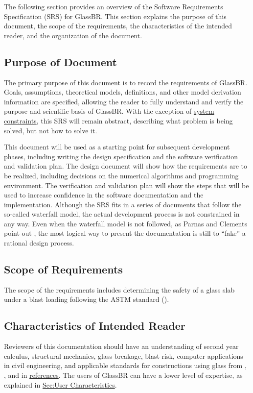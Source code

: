 \documentclass[12pt]{article}
\begin{document}
The following section provides an overview of the Software Requirements Specification (SRS) for GlassBR. This section explains the purpose of this document, the scope of the requirements, the characteristics of the intended reader, and the organization of the document.

\subsection{Purpose of Document}
\label{Sec:DocPurpose}
The primary purpose of this document is to record the requirements of GlassBR. Goals, assumptions, theoretical models, definitions, and other model derivation information are specified, allowing the reader to fully understand and verify the purpose and scientific basis of GlassBR. With the exception of \hyperref[Sec:SysConstraints]{system constraints}, this SRS will remain abstract, describing what problem is being solved, but not how to solve it.

This document will be used as a starting point for subsequent development phases, including writing the design specification and the software verification and validation plan. The design document will show how the requirements are to be realized, including decisions on the numerical algorithms and programming environment. The verification and validation plan will show the steps that will be used to increase confidence in the software documentation and the implementation. Although the SRS fits in a series of documents that follow the so-called waterfall model, the actual development process is not constrained in any way. Even when the waterfall model is not followed, as Parnas and Clements point out \cite{parnasClements1986}, the most logical way to present the documentation is still to ``fake'' a rational design process.

\subsection{Scope of Requirements}
\label{Sec:ReqsScope}
The scope of the requirements includes determining the safety of a glass slab under a blast loading following the ASTM standard (\cite{astm2009}).

\subsection{Characteristics of Intended Reader}
\label{Sec:ReaderChars}
Reviewers of this documentation should have an understanding of second year calculus, structural mechanics, glass breakage, blast risk, computer applications in civil engineering, and applicable standards for constructions using glass from \cite{astm2009}, \cite{astm2012}, and \cite{astm2016} in \hyperref[Sec:References]{references}. The users of GlassBR can have a lower level of expertise, as explained in \hyperref[Sec:UserChars]{Sec:User Characteristics}.
\end{document}
